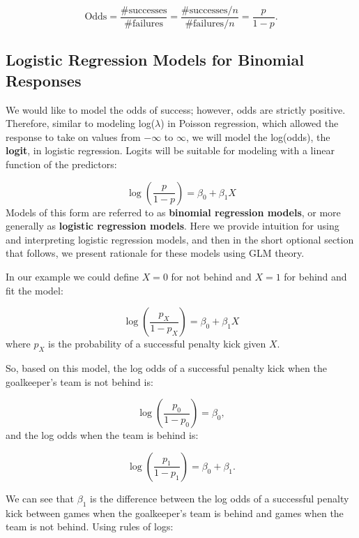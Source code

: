 \documentclass[
]{krantz}
\begin{document}
\[\textrm{Odds} = \frac{\# \textrm{successes}}{\# \textrm{failures}}=
\frac{\# \textrm{successes}/n}{\# \textrm{failures}/n}=
\frac{p}{1-p}.\]

\hypertarget{logistic-regression-models-for-binomial-responses}{%
\subsection{Logistic Regression Models for Binomial Responses}\label{logistic-regression-models-for-binomial-responses}}

We would like to model the odds of success; however, odds are strictly positive. Therefore, similar to modeling log(\(\lambda\)) in Poisson regression, which allowed the response to take on values from \(-\infty\) to \(\infty\), we will model the log(odds), the \textbf{logit},  in logistic regression. Logits will be suitable for modeling with a linear function of the predictors:

\begin{equation*}
\log\left(\frac{p}{1 - p}\right)=\beta_0+\beta_1X 
 \end{equation*}
Models of this form are referred to as \textbf{binomial regression models},  or more generally as \textbf{logistic regression models}.  Here we provide intuition for using and interpreting logistic regression models, and then in the short optional section that follows, we present rationale for these models using GLM theory.

In our example we could define \(X=0\) for not behind and \(X=1\) for behind and fit the model:

\begin{equation}
\log\left(\frac{p_X}{1-p_X}\right)=\beta_0 +\beta_1X
\label{eq:logitXform}
\end{equation}
where \(p_X\) is the probability of a successful penalty kick given \(X\).

So, based on this model, the log odds of a successful penalty kick when the goalkeeper's team is not behind is:

\[
\log\left(\frac{p_0}{1-p_0}\right) =\beta_0 \nonumber,
\]
and the log odds when the team is behind is:

\[
\log\left(\frac{p_1}{1-p_1}\right)=\beta_0+\beta_1. \nonumber
\]

We can see that \(\beta_1\) is the difference between the log odds of a successful penalty kick between games when the goalkeeper's team is behind and games when the team is not behind. Using rules of logs:
\end{document}
